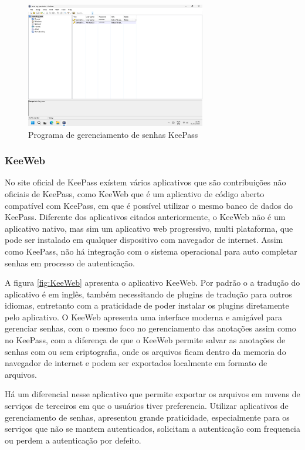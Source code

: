 \documentclass[12pt]{article}
\begin{document}
\begin{figure}[h!]
  \centering
  \includegraphics[width=0.7\textwidth]{./assets/keepass.png}
  \caption{Programa de gerenciamento de senhas KeePass}
  \label{fig:KeePass}
\end{figure}

\subsubsection{KeeWeb}

No site oficial de KeePass exístem vários aplicativos que são contribuições não oficiais
de KeePass, como KeeWeb que é um aplicativo de código aberto compatível com KeePass, em
que é possível utilizar o mesmo banco de dados do KeePass.
Diferente dos aplicativos citados anteriormente, o KeeWeb não é um aplicativo
nativo, mas sim um aplicativo web progressivo, multi plataforma, que pode ser instalado
em qualquer dispositivo com navegador de internet.
Assim como KeePass, não há integração com o sistema operacional para auto completar senhas
em processo de autenticação.

A figura \ref{fig:KeeWeb} apresenta o aplicativo KeeWeb.
Por padrão o a tradução do aplicativo é em inglês, também necessitando de plugins de
tradução para outros idiomas, entretanto com a praticidade de poder instalar os plugins
diretamente pelo aplicativo.
O KeeWeb apresenta uma interface moderna e amigável para gerenciar senhas, com o mesmo foco
no gerenciamento das anotações assim como no KeePass, com a diferença de que o KeeWeb
permite salvar as anotações de senhas com ou sem criptografia, onde os arquivos ficam
dentro da memoria do navegador de internet e podem ser exportados localmente em formato de
arquivos.

Há um diferencial nesse aplicativo que permite exportar os arquivos em nuvens de serviços
de terceiros em que o usuários tiver preferencia.
Utilizar aplicativos de gerenciamento de senhas, apresentou grande praticidade,
especialmente para os serviços que não se mantem autenticados, solicitam a
autenticação com frequencia ou perdem a autenticação por defeito.
\end{document}
